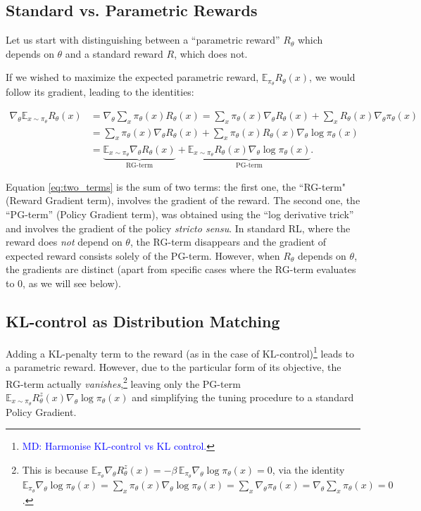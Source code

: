 \subsection{Standard vs. Parametric Rewards}

\allowdisplaybreaks

Let us start with distinguishing between a ``parametric reward'' $R_\theta$ which depends on $\theta$ and a standard reward $R$, which does not.

If we wished to maximize the expected parametric reward, $\mathbb{E}_{{\pi_\theta}} R_\theta(x)$, 
we would follow its gradient, leading to the identities:

\begin{align}
    \nabla_\theta \mathbb{E}_{x \sim {\pi_\theta}} R_\theta(x) &= \nabla_\theta \sum_x {\pi_\theta}(x) R_\theta(x) 
    = \sum_x {\pi_\theta}(x) \nabla_\theta R_\theta(x) + \sum_x R_\theta(x) \nabla_\theta {\pi_\theta}(x) \\
    &= \sum_x {\pi_\theta}(x) \nabla_\theta R_\theta(x) + \sum_x {\pi_\theta}(x) R_\theta(x) \nabla_\theta \log {\pi_\theta}(x) \\
    &= \underbrace{\mathbb{E}_{x \sim {\pi_\theta}} \nabla_\theta R_\theta(x)}_{\textrm{RG-term}} + \underbrace{\mathbb{E}_{x \sim {\pi_\theta}} R_\theta(x) \nabla_\theta \log {\pi_\theta}(x)}_{\textrm{PG-term}}. \label{eq:two_terms}
\end{align}

Equation \eqref{eq:two_terms} is the sum of two terms: the first one, the ``RG-term" (Reward Gradient term), involves the gradient of the reward. The second one, the ``PG-term'' (Policy Gradient term), was obtained using the ``log derivative trick'' and involves the gradient of the policy \emph{stricto sensu}. In standard RL, where the reward does \emph{not} depend on $\theta$, the RG-term disappears and the gradient of expected reward consists solely of the PG-term. However, when $R_\theta$ depends on $\theta$, the gradients are distinct (apart from specific cases where the RG-term evaluates to $0$, as we will see below).

\subsection{KL-control as Distribution Matching}

Adding a KL-penalty term to the reward (as in the case of KL-control){\color{blue}\footnote{\textcolor{blue}{MD: Harmonise KL-control vs KL control.}}} leads to a parametric reward. However, due to the particular form of its objective, the RG-term actually \emph{vanishes},\footnote{This is because $\mathbb{E}_{\pi_\theta} \nabla_\theta R^z_\theta(x) = -\beta\, \mathbb{E}_{\pi_\theta} \nabla_\theta \log {\pi_\theta}(x) = 0$, via the identity $\mathbb{E}_{\pi_\theta} \nabla_\theta \log {\pi_\theta}(x) = \sum_x {\pi_\theta}(x) \nabla_\theta \log {\pi_\theta}(x) = \sum_x \nabla_\theta {\pi_\theta}(x) = \nabla_\theta \sum_x {\pi_\theta}(x) = 0$.} leaving only the PG-term $\mathbb{E}_{x \sim {\pi_\theta}} R^z_\theta(x) \nabla_\theta \log {\pi_\theta}(x)$ and simplifying the tuning procedure to a standard Policy Gradient.

